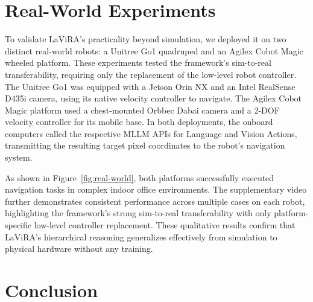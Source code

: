 \documentclass[letterpaper, 10 pt, conference]{ieeeconf}
\begin{document}
\section{Real-World Experiments}
To validate LaViRA's practicality beyond simulation, we deployed it on two distinct real-world robots: a Unitree Go1 quadruped and an Agilex Cobot Magic wheeled platform. These experiments tested the framework's sim-to-real transferability, requiring only the replacement of the low-level robot controller.
The Unitree Go1 was equipped with a Jetson Orin NX and an Intel RealSense D435i camera, using its native velocity controller to navigate. The Agilex Cobot Magic platform used a chest-mounted Orbbec Dabai camera and a 2-DOF velocity controller for its mobile base. In both deployments, the onboard computers called the respective MLLM APIs for Language and Vision Actions, transmitting the resulting target pixel coordinates to the robot's navigation system.

As shown in Figure~\ref{fig:real-world}, both platforms successfully executed navigation tasks in complex indoor office environments. The supplementary video further demonstrates consistent performance across multiple cases on each robot, highlighting the framework's strong sim-to-real transferability with only platform-specific low-level controller replacement. These qualitative results confirm that LaViRA's hierarchical reasoning generalizes effectively from simulation to physical hardware without any training.

\section{Conclusion}


\end{document}
